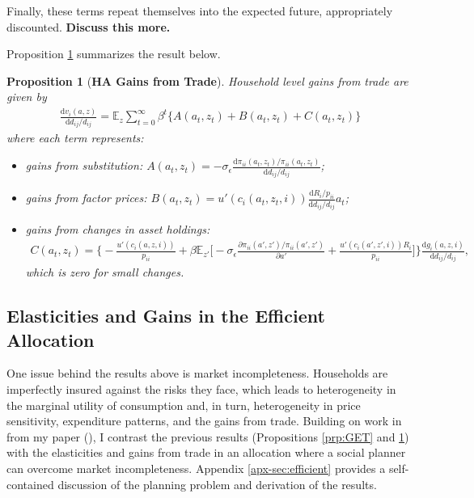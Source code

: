 \documentclass[12pt,pdftex]{article}
\newtheorem{prp}{Proposition}
\begin{document}
\begin{onehalfspacing}
Finally, these terms repeat themselves into the expected future, appropriately discounted. \textbf{Discuss this more.}

Proposition \ref{prp:gains-trade} summarizes the result below.

\begin{prp}[\textbf{HA Gains from Trade}] \label{prp:gains-trade} Household level gains from trade are given by
{\footnotesize
\begin{align}
\nonumber
\frac{\mathrm{d} v_i(a, z)}{\mathrm{d} d_{ij} / d_{ij}} = \mathbb{E}_{z} \sum_{t = 0}^{\infty} \beta^{t} \bigg \{ A(a_{t},z_{t}) + B(a_{t},z_{t}) + C(a_{t},z_{t}) \bigg \}
\end{align}
}where each term represents:
\begin{itemize}
\item gains from substitution: $A(a_{t},z_{t}) = -\sigma_{\epsilon} \frac{\mathrm{d} \pi_{ii}(a_{t},z_{t}) / \pi_{ii}(a_{t},z_{t})}{\mathrm{d}d_{ij} / d_{ij}}$;

\item gains from factor prices: $B(a_{t},z_{t}) = u'(c_{i}(a_{t},z_{t},i))\frac{\mathrm{d} R_{i}/p_{ii}}{\mathrm{d} d_{ij} / d_{ij}}a_{t}$;

\item gains from changes in asset holdings:
{\footnotesize
\begin{align}
\nonumber
C(a_{t},z_{t}) = \bigg \{- \frac{u'(c_{i}(a,z,i))}{p_{ii}} + \beta \mathbb{E}_{z'} \bigg [-\sigma_{\epsilon} \frac{\partial \pi_{ii}(a',z') / \pi_{ii}(a',z')}{\partial a'} + \frac{u'(c_{i}(a',z',i))R_{i}}{p_{ii}} \bigg ] \bigg \}\frac{\mathrm{d} g_{i}(a,z,i)}{\mathrm{d} d_{ij} / d_{ij}},
\end{align}}
which is zero for small changes.
\end{itemize}
\end{prp}

\subsection{Elasticities and Gains in the Efficient Allocation}\label{sec:efficient}

One issue behind the results above is market incompleteness. Households are imperfectly insured against the risks they face, which leads to heterogeneity in the marginal utility of consumption and, in turn, heterogeneity in price sensitivity, expenditure patterns, and the gains from trade. Building on work in from my paper (\citet{waughoptimal}), I contrast the previous results (Propositions \ref{prp:GET} and \ref{prp:gains-trade}) with the elasticities and gains from trade in an allocation where a social planner can overcome market incompleteness. Appendix \ref{apx-sec:efficient} provides a self-contained discussion of the planning problem and derivation of the results.


\end{onehalfspacing}
\end{document}

